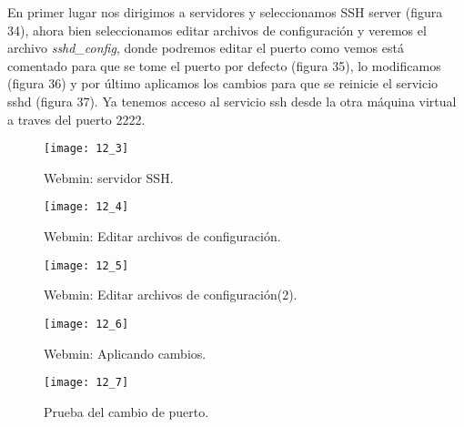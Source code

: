 \documentclass[a4paper, 11pt]{article} %
\begin{document}
En primer lugar nos dirigimos a servidores y seleccionamos SSH server (figura 34), ahora bien seleccionamos editar archivos de configuración y veremos el archivo \textit{sshd\_config}, donde podremos editar el puerto como vemos está comentado para que se tome el puerto por defecto (figura 35), lo modificamos (figura 36) y por último aplicamos los cambios para que se reinicie el servicio sshd (figura 37). Ya tenemos acceso al servicio ssh desde la otra máquina virtual a traves del puerto 2222.

\begin{figure}[h]
\centering 
\texttt{[image: 12\_3]} 
\caption{Webmin: servidor SSH.} 
\vspace{-0.5cm}
\label{contexto:figura} 
\end{figure}
\begin{figure}[h]
\centering 
\texttt{[image: 12\_4]} 
\caption{Webmin: Editar archivos de configuración.} 
\vspace{-0.5cm}
\label{contexto:figura} 
\end{figure}
\begin{figure}[h]
\centering 
\texttt{[image: 12\_5]} 
\caption{Webmin: Editar archivos de configuración(2).} 
\vspace{-0.5cm}
\label{contexto:figura} 
\end{figure}
\begin{figure}[h]
\centering 
\texttt{[image: 12\_6]} 
\caption{Webmin: Aplicando cambios.} 
\vspace{-0.5cm}
\label{contexto:figura} 
\end{figure}
\begin{figure}[h]
\centering 
\texttt{[image: 12\_7]} 
\caption{Prueba del cambio de puerto.} 
\vspace{-0.5cm}
\label{contexto:figura} 
\end{figure}
\pagebreak
\end{document}
